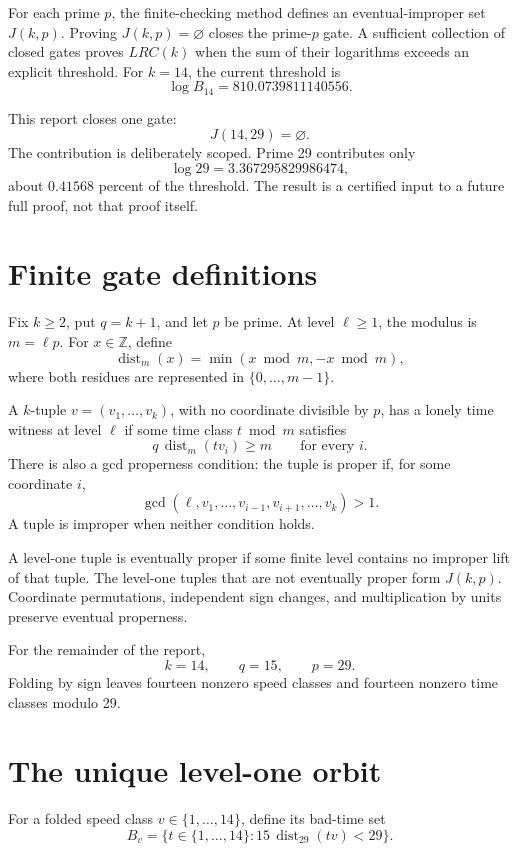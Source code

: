 \documentclass[11pt]{article}
\newcommand{\distm}[2]{\operatorname{dist}_{#1}(#2)}
\newcommand{\Z}{\mathbb{Z}}
\begin{document}
For each prime \(p\), the finite-checking method defines an
eventual-improper set \(J(k,p)\).  Proving \(J(k,p)=\varnothing\) closes the
prime-\(p\) gate.  A sufficient collection of closed gates proves \(LRC(k)\)
when the sum of their logarithms exceeds an explicit threshold.  For
\(k=14\), the current threshold is
\[
  \log B_{14}=810.0739811140556.
\]

This report closes one gate:
\[
  J(14,29)=\varnothing.
\]
The contribution is deliberately scoped.  Prime 29 contributes only
\[
  \log 29=3.367295829986474,
\]
about \(0.41568\) percent of the threshold.  The result is a certified input
to a future full proof, not that proof itself.

\section{Finite gate definitions}

Fix \(k\geq 2\), put \(q=k+1\), and let \(p\) be prime.  At level
\(\ell\geq 1\), the modulus is \(m=\ell p\).  For \(x\in\Z\), define
\[
  \distm{m}{x}=\min(x\bmod m,-x\bmod m),
\]
where both residues are represented in \(\{0,\ldots,m-1\}\).

A \(k\)-tuple \(v=(v_1,\ldots,v_k)\), with no coordinate divisible by
\(p\), has a lonely time witness at level \(\ell\) if some time class
\(t\bmod m\) satisfies
\[
  q\,\distm{m}{t v_i}\geq m
  \qquad\text{for every }i.
\]
There is also a gcd properness condition: the tuple is proper if, for some
coordinate \(i\),
\[
  \gcd(\ell,v_1,\ldots,v_{i-1},v_{i+1},\ldots,v_k)>1.
\]
A tuple is improper when neither condition holds.

A level-one tuple is eventually proper if some finite level contains no
improper lift of that tuple.  The level-one tuples that are not eventually
proper form \(J(k,p)\).  Coordinate permutations, independent sign changes,
and multiplication by units preserve eventual properness.

For the remainder of the report,
\[
  k=14,\qquad q=15,\qquad p=29.
\]
Folding by sign leaves fourteen nonzero speed classes and fourteen nonzero
time classes modulo 29.

\section{The unique level-one orbit}

For a folded speed class \(v\in\{1,\ldots,14\}\), define its bad-time set
\[
  B_v=\{t\in\{1,\ldots,14\}:
        15\,\distm{29}{t v}<29\}.
\]
\end{document}

